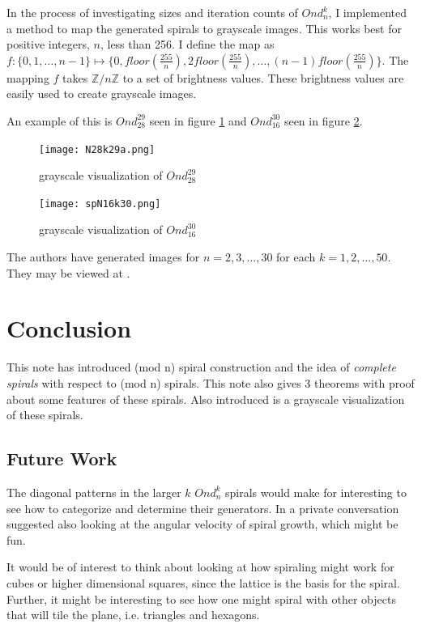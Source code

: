 \documentclass[11pt]{amsart}
\theoremstyle{mydef}
\begin{document}
In the process of investigating sizes and iteration counts of $Ond^k_n$, I implemented a method to map the generated spirals to grayscale images. This works best for positive integers, $n$, less than 256. I define the map as $f : \{ 0, 1, \ldots, n-1 \} \mapsto \{ 0, floor(\frac{255}{n}), 2floor(\frac{255}{n}), \ldots, (n-1)floor(\frac{255}{n}) \}$. The mapping $f$ takes $\mathbb{Z}/n\mathbb{Z}$ to a set of brightness values. These brightness values are easily used to create grayscale images.

An example of this is $Ond^{29}_{28}$ seen in figure \ref{fig:viz2928} and $Ond^{30}_{16}$ seen in figure \ref{fig:viz1630}.

\begin{figure}[h]
\centering
\texttt{[image: N28k29a.png]}
\caption{grayscale visualization of $Ond^{29}_{28}$}
\label{fig:viz2928}
\end{figure}

\begin{figure}
\centering
\texttt{[image: spN16k30.png]}
\caption{grayscale visualization of $Ond^{30}_{16}$}
\label{fig:viz1630}
\end{figure}

The authors have generated images for $n=2, 3, \ldots, 30$ for each $k=1, 2, \ldots, 50$. They may be viewed at \cite{GraySquare}.

\section{Conclusion}
This note has introduced (mod n) spiral construction and the idea of \textit{complete spirals} with respect to (mod n) spirals. This note also gives 3 theorems with proof about some features of these spirals. Also introduced is a grayscale visualization of these spirals. 

\subsection{Future Work}
The diagonal patterns in the larger $k$ $Ond^k_n$ spirals would make for interesting to see how to categorize and determine their generators. In a private conversation \cite{Kusner} suggested also looking at the angular velocity of spiral growth, which might be fun.

It would be of interest to think about looking at how spiraling might work for cubes or higher dimensional squares, since the lattice is the basis for the spiral. Further, it might be interesting to see how one might spiral with other objects that will tile the plane, i.e. triangles and hexagons.
\end{document}
